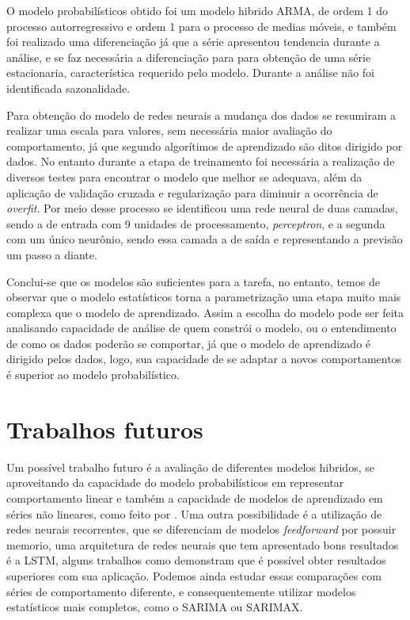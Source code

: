\documentclass[
    12pt,
    oneside,
    a4paper,
    english,
    brazil
]{abntex2}
\begin{document}
O  modelo probabilísticos  obtido foi  um modelo  hibrido ARMA,  de ordem  1 do
processo autorregressivo e  ordem 1 para o processo de  medias móveis, e também
foi realizado uma  diferenciação já que a série apresentou  tendencia durante a
análise, e  se faz necessária a  diferenciação para para obtenção  de uma série
estacionaria, característica requerido  pelo modelo. Durante a  análise não foi
identificada sazonalidade.

Para  obtenção do  modelo de  redes neurais  a mudança  dos dados  se resumiram
a  realizar  uma  escala  para  valores,  sem  necessária  maior  avaliação  do
comportamento, já  que segundo   algorítimos  de aprendizado
são ditos  dirigido por dados.  No entanto durante  a etapa de  treinamento foi
necessária  a  realização  de  diversos  testes para  encontrar  o  modelo  que
melhor  se adequava,  além da  aplicação de  validação cruzada  e regularização
para  diminuir a  ocorrência de  \textit{overfit}. Por  meio desse  processo se
identificou uma rede neural de duas camadas,  sendo a de entrada com 9 unidades
de processamento, \textit{perceptron}, e a segunda com um único neurônio, sendo
essa camada a de saída e representando a previsão um passo a diante.

Conclui-se que os  modelos são suficientes para a tarefa,  no entanto, temos de
observar que o modelo estatísticos torna  a parametrização uma etapa muito mais
complexa que o modelo de aprendizado. Assim  a escolha do modelo pode ser feita
analisando capacidade de  análise de quem constrói o modelo,  ou o entendimento
de  como os  dados poderão  se  comportar, já  que  o modelo  de aprendizado  é
dirigido pelos dados, logo, sua capacidade de se adaptar a novos comportamentos
é superior ao modelo probabilístico.

\section{Trabalhos futuros}

Um  possível trabalho  futuro é  a  avaliação de  diferentes modelos  hibridos,
se  aproveitando  da  capacidade   do  modelo  probabilísticos  em  representar
comportamento linear e também a capacidade  de modelos de aprendizado em séries
não  lineares, como  feito por  . Uma  outra
possibilidade é a  utilização de redes neurais recorrentes,  que se diferenciam
de modelos \textit{feedforward}  por possuir memorio, uma  arquitetura de redes
neurais  que  tem  apresentado  bons  resultados é  a  LSTM,  alguns  trabalhos
como    demonstram   que  é  possível
obter  resultados superiores  com sua  aplicação. Podemos  ainda estudar  essas
comparações com séries de  comportamento diferente, e consequentemente utilizar
modelos estatísticos mais completos, como o SARIMA ou SARIMAX\@.

\postextual


\end{document}
